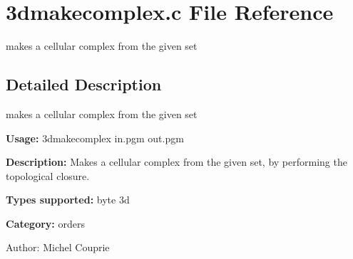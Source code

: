 \section{3dmakecomplex.c File Reference}
\label{3dmakecomplex_8c}
makes a cellular complex from the given set  




\label{_details}
\subsection{Detailed Description}
makes a cellular complex from the given set 

{\bf Usage:} 3dmakecomplex in.pgm out.pgm

{\bf Description:} Makes a cellular complex from the given set, by performing the topological closure.

{\bf Types supported:} byte 3d

{\bf Category:} orders

\begin{Desc}
\item[Author:]Michel Couprie \end{Desc}
